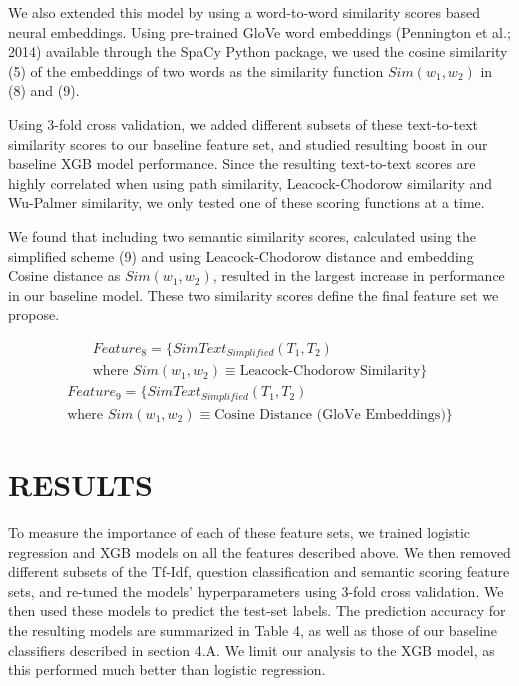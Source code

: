 \documentclass[letterpaper, 10 pt, conference]{ieeeconf}  %
\begin{document}
We also extended this model by using a word-to-word similarity scores based neural embeddings. Using pre-trained GloVe word embeddings (Pennington et al.; 2014) available through the SpaCy Python package, we used the cosine similarity (5) of the embeddings of two words as the similarity function $Sim(w_1,w_2)$ in (8) and (9). 

Using 3-fold cross validation, we added different subsets of these text-to-text similarity scores to our baseline feature set, and studied resulting boost in our baseline XGB model performance. Since the resulting text-to-text scores are highly correlated when using path similarity, Leacock-Chodorow similarity and Wu-Palmer similarity, we only tested one of these scoring functions at a time. 

We found that including two semantic similarity scores, calculated using the simplified scheme (9) and using Leacock-Chodorow distance and embedding Cosine distance as $Sim(w_1, w_2)$, resulted in the largest increase in performance in our baseline model. These two similarity scores define the final feature set we propose. 

\begin{gather*} \tag{10}
Feature_{8} = \{SimText_{Simplified}(T_1, T_2) \\ \text{where } Sim(w_1, w_2) \equiv \text{Leacock-Chodorow Similarity}\}
\end{gather*}
\begin{gather*} \tag{11}
Feature_{9} = \{SimText_{Simplified}(T_1, T_2) \\ \text{where } Sim(w_1, w_2) \equiv \text{Cosine Distance (GloVe Embeddings)}\}
\end{gather*}


\section{RESULTS}

To measure the importance of each of these feature sets, we trained logistic regression and XGB models on all the features described above. We then removed different subsets of the Tf-Idf, question classification and semantic scoring feature sets, and re-tuned the models’ hyperparameters using 3-fold cross validation. We then used these models to predict the test-set labels. The prediction accuracy for the resulting models are summarized in Table 4, as well as those of our baseline classifiers described in section 4.A. We limit our analysis to the XGB model, as this performed much better than logistic regression. 
\end{document}
